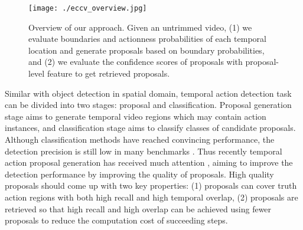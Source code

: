 \documentclass[runningheads]{llncs}
\begin{document}
\begin{figure}[t]
\setlength{\abovecaptionskip}{-0.3cm} %
\setlength{\belowcaptionskip}{-0.5cm} %
\begin{center}
\begin{minipage}[b]{1.0\linewidth}
  \centering
  \centerline{\texttt{[image: ./eccv\_overview.jpg]}}
  \medskip
\end{minipage}
\end{center}
   \caption{Overview of our approach. Given an untrimmed video, (1) we evaluate boundaries and actionness probabilities of each temporal location and generate proposals based on boundary probabilities, and (2) we evaluate the confidence scores of proposals with proposal-level feature to get retrieved proposals.}
\label{fig_overview}
\end{figure}


Similar with object detection in spatial domain, temporal action detection task can be divided into two stages: proposal and classification. Proposal generation stage aims to generate temporal video regions which may contain action instances, and classification stage aims to classify classes of candidate proposals.
Although  classification methods  have reached convincing performance,  the detection precision is still low in many benchmarks \cite{caba2015activitynet,jiang2014thumos}.
%
Thus recently temporal action proposal generation has received much attention  \cite{sst_buch_cvpr17,fast_temporal_activity_cvpr16,escorcia2016daps,gao2017turn}, aiming to improve the detection performance by improving the quality of proposals.
High quality proposals should come up with two key properties: (1) proposals can cover truth action regions with both high recall and high temporal overlap, (2) proposals are retrieved so that high recall and high overlap can be achieved using fewer proposals to reduce the computation cost of succeeding steps.

\end{document}
